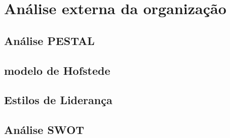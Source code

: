 \chapter{Análise externa da organização}
\label{Chapter3} %

\section{Análise PESTAL}
\section{modelo de Hofstede}
\section{Estilos de Liderança}
\section{Análise SWOT}